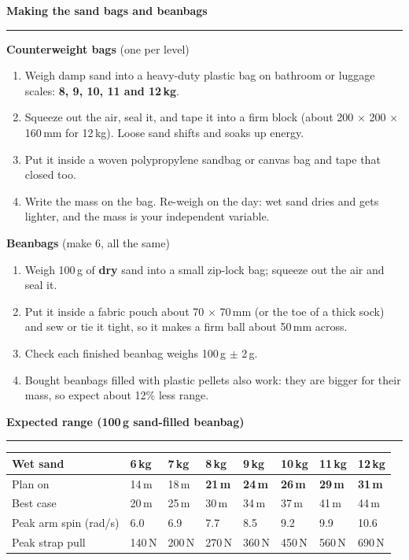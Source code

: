 \documentclass[11pt,a4paper]{article}
\newcommand{\sechead}[1]{%
  \par\vspace{6pt}%
  {\bfseries\large\color{HeadGrey} #1}\\[-4pt]
  {\color{RuleGrey}\rule{\linewidth}{0.8pt}}\par\vspace{1pt}
}
\begin{document}
\sechead{Making the sand bags and beanbags}
\begin{minipage}[t]{0.48\linewidth}
\textbf{Counterweight bags} (one per level)
\begin{enumerate}[itemsep=1pt, leftmargin=1.5em, topsep=1pt]
  \item Weigh damp sand into a heavy-duty plastic bag on bathroom or luggage scales: \textbf{8, 9, 10, 11 and 12\,kg}.
  \item Squeeze out the air, seal it, and tape it into a firm block (about 200 $\times$ 200 $\times$ 160\,mm for 12\,kg). Loose sand shifts and soaks up energy.
  \item Put it inside a woven polypropylene sandbag or canvas bag and tape that closed too.
  \item Write the mass on the bag. Re-weigh on the day: wet sand dries and gets lighter, and the mass is your independent variable.
\end{enumerate}
\end{minipage}\hfill
\begin{minipage}[t]{0.48\linewidth}
\textbf{Beanbags} (make 6, all the same)
\begin{enumerate}[itemsep=1pt, leftmargin=1.5em, topsep=1pt]
  \item Weigh 100\,g of \textbf{dry} sand into a small zip-lock bag; squeeze out the air and seal it.
  \item Put it inside a fabric pouch about 70 $\times$ 70\,mm (or the toe of a thick sock) and sew or tie it tight, so it makes a firm ball about 50\,mm across.
  \item Check each finished beanbag weighs 100\,g $\pm$ 2\,g.
  \item Bought beanbags filled with plastic pellets also work: they are bigger for their mass, so expect about 12\% less range.
\end{enumerate}
\end{minipage}

\sechead{Expected range (100\,g sand-filled beanbag)}
{\footnotesize
\begin{tabularx}{\linewidth}{@{}L{2.6cm} *{7}{Y}@{}}
\toprule
\textbf{Wet sand} & 6\,kg & 7\,kg & \textbf{8\,kg} & \textbf{9\,kg} & \textbf{10\,kg} & \textbf{11\,kg} & \textbf{12\,kg} \\
\midrule
Plan on & 14\,m & 18\,m & \textbf{21\,m} & \textbf{24\,m} & \textbf{26\,m} & \textbf{29\,m} & \textbf{31\,m} \\
Best case & 20\,m & 25\,m & 30\,m & 34\,m & 37\,m & 41\,m & 44\,m \\
Peak arm spin (rad/s) & 6.0 & 6.9 & 7.7 & 8.5 & 9.2 & 9.9 & 10.6 \\
Peak strap pull & 140\,N & 200\,N & 270\,N & 360\,N & 450\,N & 560\,N & 690\,N \\
\bottomrule
\end{tabularx}}
\end{document}
